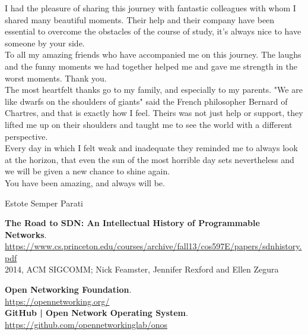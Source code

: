 \documentclass[a4paper,10pt]{memoir}
\begin{document}
{I had the pleasure of sharing this journey with fantastic colleagues with whom I shared many beautiful moments. Their help and their company have been essential to overcome the obstacles of the course of study, it's always nice to have someone by your side.\\

To all my amazing friends who have accompanied me on this journey. The laughs and the funny moments we had together helped me and gave me strength in the worst moments. Thank you.\\

The most heartfelt thanks go to my family, and especially to my parents. 
"We are like dwarfs on the shoulders of giants" said the French philosopher Bernard of Chartres, and that is exactly how I feel. 
Theirs was not just help or support, they lifted me up on their shoulders and taught me to see the world with a different perspective.\\
Every day in which I felt weak and inadequate they reminded me to always look at the horizon, that even the sun of the most horrible day sets nevertheless and we will be given a new chance to shine again.\\
You have been amazing, and always will be.\\

\bigskip

Estote Semper Parati



\begin{thebibliography}{9}

  \textbf{The Road to SDN: An Intellectual History of Programmable Networks}.\\
  \href{https://www.cs.princeton.edu/courses/archive/fall13/cos597E/papers/sdnhistory.pdf}{https://www.cs.princeton.edu/courses/archive/fall13/cos597E/papers/sdnhistory.pdf}\\
  2014, ACM SIGCOMM; Nick Feamster, Jennifer Rexford and Ellen Zegura

  \textbf{Open Networking Foundation}.\\
  \href{https://opennetworking.org/}{https://opennetworking.org/}\\

  \textbf{GitHub | Open Network Operating System}.\\
  \href{https://github.com/opennetworkinglab/onos}{https://github.com/opennetworkinglab/onos}\\


\end{thebibliography}}
\end{document}
